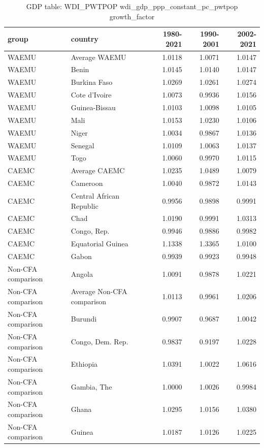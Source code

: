\begin{table}

\caption{GDP table: WDI_PWTPOP wdi_gdp_ppp_constant_pc_pwtpop growth_factor}
\centering
\begin{tabular}[t]{llrrr}
\toprule
group & country & 1980-2021 & 1990-2001 & 2002-2021\\
\midrule
WAEMU & Average WAEMU & 1.0118 & 1.0071 & 1.0147\\
WAEMU & Benin & 1.0145 & 1.0140 & 1.0147\\
WAEMU & Burkina Faso & 1.0269 & 1.0261 & 1.0274\\
WAEMU & Cote d'Ivoire & 1.0073 & 0.9936 & 1.0156\\
WAEMU & Guinea-Bissau & 1.0103 & 1.0098 & 1.0105\\
\addlinespace
WAEMU & Mali & 1.0153 & 1.0230 & 1.0106\\
WAEMU & Niger & 1.0034 & 0.9867 & 1.0136\\
WAEMU & Senegal & 1.0109 & 1.0063 & 1.0137\\
WAEMU & Togo & 1.0060 & 0.9970 & 1.0115\\
CAEMC & Average CAEMC & 1.0235 & 1.0489 & 1.0079\\
\addlinespace
CAEMC & Cameroon & 1.0040 & 0.9872 & 1.0143\\
CAEMC & Central African Republic & 0.9956 & 0.9898 & 0.9991\\
CAEMC & Chad & 1.0190 & 0.9991 & 1.0313\\
CAEMC & Congo, Rep. & 0.9946 & 0.9886 & 0.9982\\
CAEMC & Equatorial Guinea & 1.1338 & 1.3365 & 1.0100\\
\addlinespace
CAEMC & Gabon & 0.9939 & 0.9923 & 0.9948\\
Non-CFA comparison & Angola & 1.0091 & 0.9878 & 1.0221\\
Non-CFA comparison & Average Non-CFA comparison & 1.0113 & 0.9961 & 1.0206\\
Non-CFA comparison & Burundi & 0.9907 & 0.9687 & 1.0042\\
Non-CFA comparison & Congo, Dem. Rep. & 0.9837 & 0.9197 & 1.0228\\
\addlinespace
Non-CFA comparison & Ethiopia & 1.0391 & 1.0022 & 1.0616\\
Non-CFA comparison & Gambia, The & 1.0000 & 1.0026 & 0.9984\\
Non-CFA comparison & Ghana & 1.0295 & 1.0156 & 1.0380\\
Non-CFA comparison & Guinea & 1.0187 & 1.0126 & 1.0225\\

\end{tabular}
\end{table}
